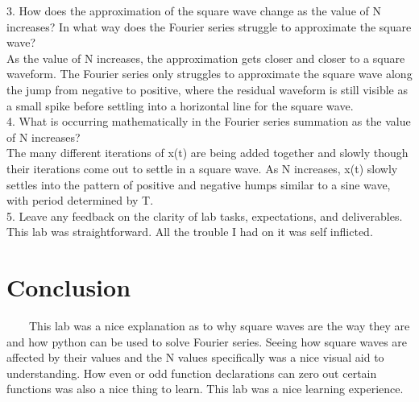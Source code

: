 \documentclass[11pt,a4]{article}
\begin{document}
3. How does the approximation of the square wave change as the value of N increases? In what way does the Fourier series struggle to approximate the square wave?\\

As the value of N increases, the approximation gets closer and closer to a square waveform. The Fourier series only struggles to approximate the square wave along the jump from negative to positive, where the residual waveform is still visible as a small spike before settling into a horizontal line for the square wave.\\

4. What is occurring mathematically in the Fourier series summation as the value of N increases?\\

The many different iterations of x(t) are being added together and slowly though their iterations come out to settle in a square wave. As N increases, x(t) slowly settles into the pattern of positive and negative humps similar to a sine wave, with period determined by T.\\

5. Leave any feedback on the clarity of lab tasks, expectations, and deliverables.\\

This lab was straightforward. All the trouble I had on it was self inflicted.

\section{Conclusion}
\ \ \ \ This lab was a nice explanation as to why square waves are the way they are and how python can be used to solve Fourier series. Seeing how square waves are affected by their values and the N values specifically was a nice visual aid to understanding. How even or odd function declarations can zero out certain functions was also a nice thing to learn. This lab was a nice learning experience.
\end{document}
